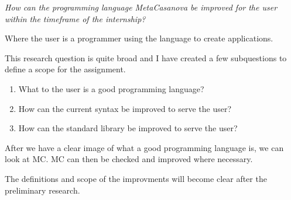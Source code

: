 \emph{How can the programming language MetaCasanova be improved for the user within the timeframe of the internship?}

Where the user is a programmer using the language to create applications.

This research question is quite broad and I have created a few subquestions to define a scope for the assignment.

\begin{enumerate}[noitemsep]
   \item What to the user is a good programming language?
   \item How can the current syntax be improved to serve the user?
   \item How can the standard library be improved to serve the user?
\end{enumerate}

After we have a clear image of what a good programming language is, we can look at MC.
MC can then be checked and improved where necessary.

The definitions and scope of the improvments will become clear after the preliminary research.





